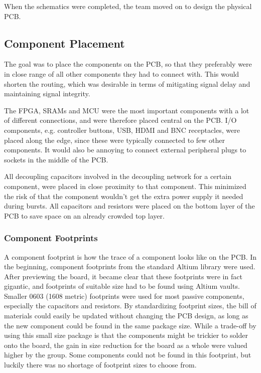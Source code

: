 When the schematics were completed, the team moved on to design the physical PCB.

\subsection{Component Placement}
The goal was to place the components on the PCB, so that they preferably were in close range of all other components they had to connect with. 
This would shorten the routing, which was desirable in terms of mitigating signal delay and maintaining signal integrity.

The FPGA, SRAMs and MCU were the most important components with a lot of different connections, and were therefore placed central on the PCB.
I/O components, e.g. controller buttons, USB, HDMI and BNC receptacles, were placed along the edge, since these were typically connected to few other components.
It would also be annoying to connect external peripheral plugs to sockets in the middle of the PCB.

All decoupling capacitors involved in the decoupling network for a certain component, were placed in close proximity to that component.
This minimized the risk of that the component wouldn't get the extra power supply it needed during bursts.
All capacitors and resistors were placed on the bottom layer of the PCB to save space on an already crowded top layer.

\subsubsection{Component Footprints}
A component footprint is how the trace of a component looks like on the PCB.
In the beginning, component footprints from the standard Altium library were used.
After previewing the board, it became clear that these footprints were in fact gigantic, and footprints of suitable size had to be found using Altium vaults.
Smaller 0603 (1608 metric) footprints were used for most passive components, especially the capacitors and resistors.
By standardizing footprint sizes, the bill of materials could easily be updated without changing the PCB design, as long as the new component could be found in the same package size.
While a trade-off by using this small size package is that the components might be trickier to solder onto the board, the gain in size reduction for the board as a whole were valued higher by the group.
Some components could not be found in this footprint, but luckily there was no shortage of footprint sizes to choose from.

